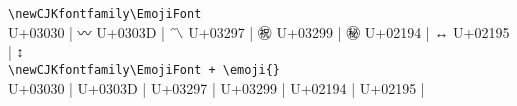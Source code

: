 \documentclass{ctexbook}
\begin{document}
\verb!\newCJKfontfamily\EmojiFont! \\
U+03030 | {\EmojiFont 〰}
U+0303D | {\EmojiFont 〽}
U+03297 | {\EmojiFont ㊗}
U+03299 | {\EmojiFont ㊙}
U+02194 | {\EmojiFont ↔} 
U+02195 | {\EmojiFont ↕} \\

\verb!\newCJKfontfamily\EmojiFont + \emoji{}! \\
U+03030 | 
U+0303D | 
U+03297 | 
U+03299 | 
U+02194 |  
U+02195 |  \\
\end{document}
